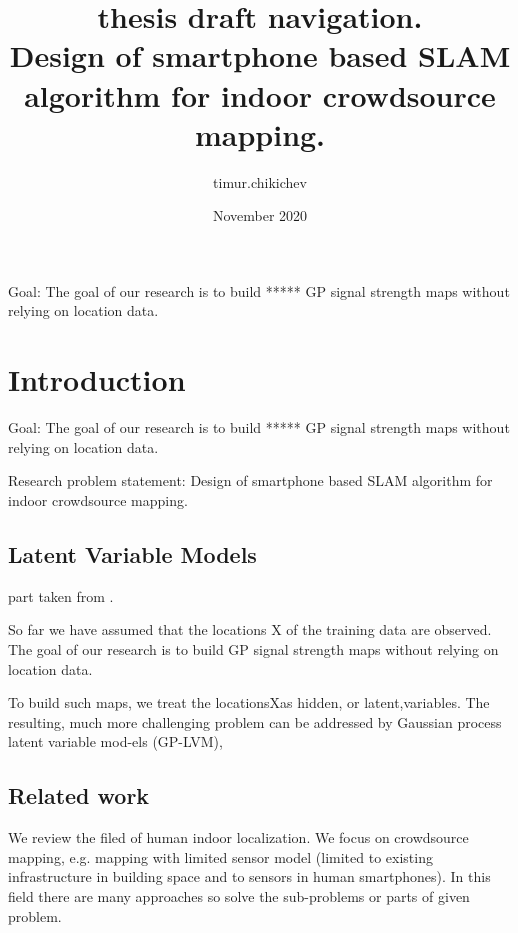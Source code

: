 \documentclass{article}
\title{thesis draft navigation. \\
Design of smartphone based SLAM algorithm for indoor crowdsource mapping.
}
\author{timur.chikichev }
\date{November 2020}
\begin{document}
\maketitle
Goal: The goal of our research is to build ***** GP signal strength maps without relying on location data. 


\section{Introduction}





Goal: The goal of our research is to build ***** GP signal strength maps without relying on location data. 

Research problem statement:
Design of smartphone based SLAM algorithm for indoor crowdsource mapping.





\subsection{Latent Variable Models}


part taken from \cite{SLAM_using_Gaussian_process_latent_variable_models}.

So  far  we  have  assumed  that  the  locations X of  the  training data are observed.  
The goal of our research is to build GP signal strength maps without relying on location data. 

To build such maps, we treat the locationsXas hidden, or latent,variables.   The  resulting,  much  more  challenging  problem can be addressed by Gaussian process latent variable mod-els (GP-LVM), 


\subsection{Related work}

We review the filed of human indoor localization. We focus on crowdsource mapping, e.g. mapping with limited sensor model (limited to existing infrastructure in building space and to sensors in human smartphones).
In this field there are many approaches so solve the sub-problems or parts of given problem. 
\end{document}
